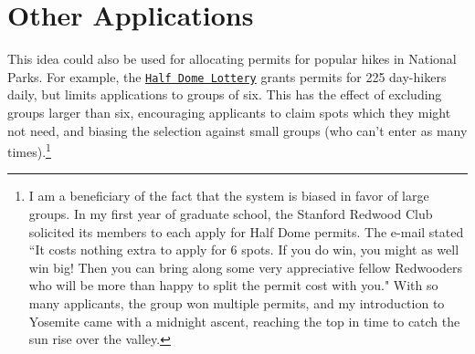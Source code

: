 \documentclass[11pt, oneside]{article}   	%
\newcommand{\link}[2]{{ \color{blue} \tt{\href{#1}{#2}}}}
\newcommand{\na}[1]{{\color{blue} #1}}
\begin{document}
\section{Other Applications}
This idea could also be used for allocating permits for popular hikes in National Parks. For example, the \link{https://www.nps.gov/yose/planyourvisit/hdpermits.htm}{Half Dome Lottery} grants permits for 225 day-hikers daily, but limits applications to groups of six. This has the effect of excluding groups larger than six, encouraging applicants to claim spots which they might not need, and biasing the selection against small groups (who can't enter as many times).\footnote{I am a beneficiary of the fact that the system is biased in favor of large groups. In my first year of graduate school, the Stanford Redwood Club solicited its members to each apply for Half Dome permits. The e-mail stated ``It costs nothing extra to apply for 6 spots. If you do win, you might as well win big!  Then you can bring along some very appreciative fellow Redwooders who will be more than happy to split the permit cost with you." With so many applicants, the group won multiple permits, and my introduction to Yosemite came with a midnight ascent, reaching the top in time to catch the sun rise over the valley.}



\end{document}
